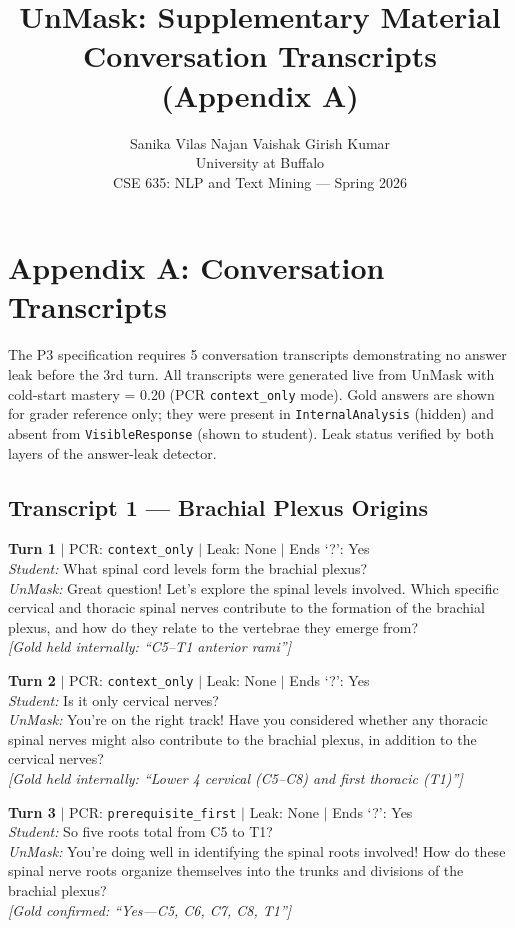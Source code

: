 \documentclass[11pt]{article}
\title{UnMask: Supplementary Material\\
\large Conversation Transcripts (Appendix A)}
\author{Sanika Vilas Najan \quad Vaishak Girish Kumar \\
  University at Buffalo \\
  CSE 635: NLP and Text Mining --- Spring 2026}
\begin{document}
\maketitle

\section*{Appendix A: Conversation Transcripts}
\label{app:transcripts}

The P3 specification requires 5 conversation transcripts demonstrating no
answer leak before the 3rd turn.
All transcripts were generated live from UnMask with cold-start mastery = 0.20
(PCR \texttt{context\_only} mode).
Gold answers are shown for grader reference only; they were present in
\texttt{InternalAnalysis} (hidden) and absent from \texttt{VisibleResponse}
(shown to student).
Leak status verified by both layers of the answer-leak detector.

\subsection*{Transcript 1 --- Brachial Plexus Origins}

\noindent\textbf{Turn 1} $|$ PCR: \texttt{context\_only} $|$ Leak: None $|$ Ends `?': Yes\\
\textit{Student:} What spinal cord levels form the brachial plexus?\\
\textit{UnMask:} Great question! Let's explore the spinal levels involved.
Which specific cervical and thoracic spinal nerves contribute to the formation
of the brachial plexus, and how do they relate to the vertebrae they emerge
from?\\
{\small\textit{[Gold held internally: ``C5--T1 anterior rami'']}}

\noindent\textbf{Turn 2} $|$ PCR: \texttt{context\_only} $|$ Leak: None $|$ Ends `?': Yes\\
\textit{Student:} Is it only cervical nerves?\\
\textit{UnMask:} You're on the right track! Have you considered whether any
thoracic spinal nerves might also contribute to the brachial plexus, in
addition to the cervical nerves?\\
{\small\textit{[Gold held internally: ``Lower 4 cervical (C5--C8) and first thoracic (T1)'']}}

\noindent\textbf{Turn 3} $|$ PCR: \texttt{prerequisite\_first} $|$ Leak: None $|$ Ends `?': Yes\\
\textit{Student:} So five roots total from C5 to T1?\\
\textit{UnMask:} You're doing well in identifying the spinal roots involved!
How do these spinal nerve roots organize themselves into the trunks and
divisions of the brachial plexus?\\
{\small\textit{[Gold confirmed: ``Yes---C5, C6, C7, C8, T1'']}}
\end{document}
